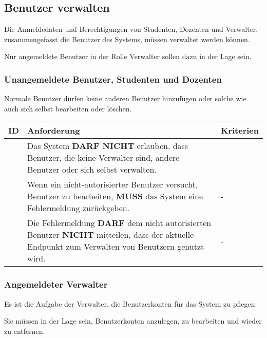 \newpage

\subsection{Benutzer verwalten}
Die Anmeldedaten und Berechtigungen von Studenten, Dozenten und Verwalter, zusammengefasst die Benutzer des Systems, müssen verwaltet werden können.

Nur angemeldete Benutzer in der Rolle Verwalter sollen dazu in der Lage sein.

\vspace{12pt}

\subsubsection{Unangemeldete Benutzer, Studenten und Dozenten}
Normale Benutzer dürfen keine anderen Benutzer hinzufügen oder solche wie auch sich selbst bearbeiten oder löschen.

\vspace{12pt}


\begin{tabular} {|p{}|p{}|p{}|}
	\hline
	ID & Anforderung & Kriterien \\
	\hline
	\printfreqnr
	& Das System \textbf{DARF NICHT} erlauben, dass Benutzer, die keine Verwalter sind, andere Benutzer oder sich selbst verwalten. 
	& - \\
	\hline
	\printfreqnr
	& Wenn ein nicht-autorisierter Benutzer versucht, Benutzer zu bearbeiten, \textbf{MUSS} das System eine Fehlermeldung zurückgeben.
	& - \\ 
	\hline
	\printfreqnr
	& Die Fehlermeldung \textbf{DARF} dem nicht autorisierten Benutzer \textbf{NICHT} mitteilen, dass der aktuelle Endpunkt zum Verwalten von Benutzern genutzt wird.
	& - \\ 
	\hline
\end{tabular}

\vspace{12pt}

\subsubsection{Angemeldeter Verwalter}
Es ist die Aufgabe der Verwalter, die Benutzerkonten für das System zu pflegen:

Sie müssen in der Lage sein, Benutzerkonten anzulegen, zu bearbeiten und wieder zu entfernen.

\vspace{12pt}

